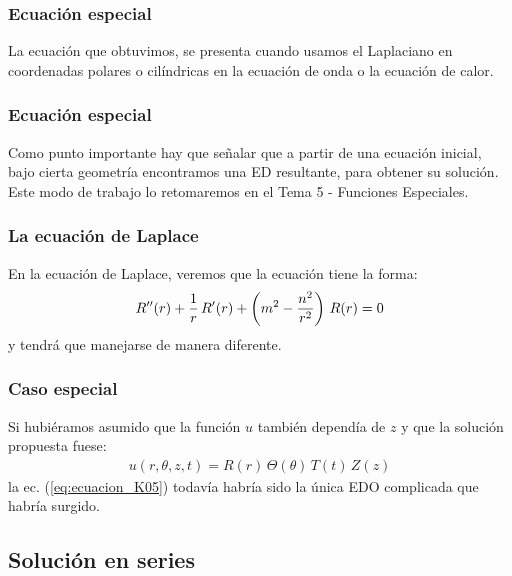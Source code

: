 \documentclass[12pt]{beamer}
\begin{document}
\begin{frame}
\frametitle{Ecuación especial}
La ecuación que obtuvimos, se presenta cuando usamos el Laplaciano en coordenadas polares o cilíndricas en la ecuación de onda o la ecuación de calor.
\end{frame}
\begin{frame}
\frametitle{Ecuación especial}
Como punto importante hay que señalar que a partir de una ecuación inicial, bajo cierta geometría encontramos una ED resultante, para obtener su solución. Este modo de trabajo lo retomaremos en el Tema 5 - Funciones Especiales.
\end{frame}
\begin{frame}
\frametitle{La ecuación de Laplace}
En la ecuación de Laplace, veremos que la ecuación tiene la forma:
\pause
\begin{align*}
{R}^{\prime \prime} (r) + \dfrac{1}{r} \, {R}^{\prime} (r) + \left( m^{2} - \dfrac{n^{2}}{r^{2}} \right) \, R (r) = 0
\end{align*}
y tendrá que manejarse de manera diferente.
\end{frame}
\begin{frame}
\frametitle{Caso especial}
Si hubiéramos asumido que la función $u$ también dependía de $z$ y que la solución propuesta fuese:
\pause
\begin{align*}
u (r, \theta, z, t) =  R (r) \, \Theta (\theta) \, T (t) \, Z (z)
\end{align*}
la ec. (\ref{eq:ecuacion_K05}) todavía habría sido la única EDO complicada que habría surgido.
\end{frame}

\subsection{Solución en series}
\end{document}
